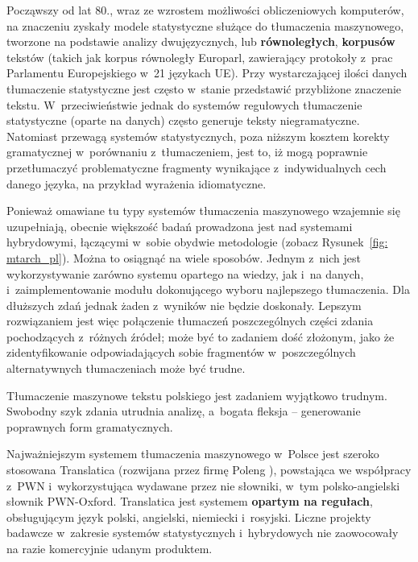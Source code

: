 \begin{multicols}{2}
Począwszy od lat 80., wraz ze wzrostem możliwości obliczeniowych
komputerów, na znaczeniu zyskały modele statystyczne służące do
tłumaczenia maszynowego, tworzone na podstawie analizy
dwujęzycznych, lub \textbf{równoległych}, \textbf{korpusów}
tekstów (takich jak korpus równoległy Europarl, zawierający
protokoły z~prac Parlamentu Europejskiego w~21 językach UE). Przy
wystarczającej ilości danych tłumaczenie statystyczne jest często
w~stanie przedstawić przybliżone znaczenie tekstu.
W~przeciwieństwie jednak do systemów regułowych tłumaczenie
statystyczne (oparte na danych) często generuje teksty
niegramatyczne. Natomiast przewagą systemów statystycznych, poza
niższym kosztem korekty gramatycznej w~porównaniu z~tłumaczeniem,
jest to, iż mogą poprawnie przetłumaczyć problematyczne fragmenty
wynikające z~indywidualnych cech danego języka, na przykład
wyrażenia idiomatyczne. 

Ponieważ omawiane tu typy systemów tłumaczenia maszynowego
wzajemnie się uzupełniają, obecnie większość badań prowadzona
jest nad systemami hybrydowymi, łączącymi w~sobie obydwie
metodologie (zobacz Rysunek~\ref{fig: mtarch_pl}). Można to
osiągnąć na wiele sposobów. Jednym z~nich jest wykorzystywanie
zarówno systemu opartego na wiedzy, jak i~na danych,
i~zaimplementowanie modułu dokonującego wyboru najlepszego
tłumaczenia. Dla dłuższych zdań jednak żaden z~wyników nie
będzie doskonały. Lepszym rozwiązaniem jest więc połączenie
tłumaczeń poszczególnych części zdania pochodzących z~różnych
źródeł; może być to zadaniem dość złożonym, jako że
zidentyfikowanie odpowiadających sobie fragmentów w~poszczególnych
alternatywnych tłumaczeniach może być trudne. 


Tłumaczenie maszynowe tekstu polskiego jest zadaniem wyjątkowo
trudnym. Swobodny szyk zdania utrudnia analizę, a~bogata fleksja –
generowanie poprawnych form gramatycznych. 

Najważniejszym systemem tłumaczenia maszynowego w~Polsce jest
szeroko stosowana Translatica (rozwijana przez firmę Poleng
\cite{Jassem2006}), powstająca we współpracy z~PWN
i~wykorzystująca wydawane przez nie słowniki, w~tym polsko-angielski
słownik PWN-Oxford. Translatica jest systemem \textbf{opartym na
regułach}, obsługującym język polski, angielski, niemiecki
i~rosyjski. Liczne projekty badawcze w~zakresie systemów
statystycznych i~hybrydowych nie zaowocowały na razie komercyjnie
udanym produktem. 


\end{multicols}
